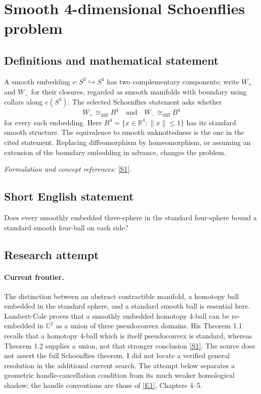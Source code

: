 \documentclass[11pt,a4paper]{article}
\newcommand{\R}{\mathbb{R}}
\newcommand{\C}{\mathbb{C}}
\newcommand{\sref}[2]{\hyperlink{source:#1:#2}{[S#2]}}
\newcommand{\eref}[2]{\hyperlink{extra:#1:#2}{[E#2]}}
\newif\ifshowcatalogue
\newcommand{\cataloguescope}[1]{\ifshowcatalogue
 \paragraph{Exact scope in the supplied catalogue.}
 \begin{quote}\small #1\end{quote}\fi}
\numberwithin{equation}{section}
\begin{document}
\setcounter{section}{0}
\clearpage
\section*{\texorpdfstring{Smooth 4-dimensional Schoenflies problem}{Smooth 4-dimensional Schoenflies problem}}\label{statement}
\subsection{Definitions and mathematical statement}
A smooth embedding $e:S^3\hookrightarrow S^4$ has two complementary components; write $W_+$ and $W_-$ for their closures, regarded as smooth manifolds with boundary using collars along $e(S^3)$. The selected Schoenflies statement asks whether
\[
 W_+\cong_{\mathrm{diff}}B^4\quad\text{and}\quad W_-\cong_{\mathrm{diff}}B^4
\]
for every such embedding. Here $B^4=\{x\in\R^4:\|x\|\le1\}$ has its standard smooth structure. The equivalence to smooth unknottedness is the one in the cited statement. Replacing diffeomorphism by homeomorphism, or assuming an extension of the boundary embedding in advance, changes the problem.
\par\smallskip\textit{Formulation and concept references:} \sref{statement}{1}.
\cataloguescope{Determine whether every smooth embedding of S\textasciicircum{}3 in S\textasciicircum{}4 is smoothly unknotted; equivalently, whether each of its two complementary closures is diffeomorphic to the standard 4-ball B\textasciicircum{}4.}
\subsection{Short English statement}
Does every smoothly embedded three-sphere in the standard four-sphere bound a standard smooth four-ball on each side?
\subsection{Research attempt}

\paragraph{Current frontier.}
The distinction between an abstract contractible manifold, a homotopy
ball embedded in the standard sphere, and a standard smooth ball is
essential here. Lambert-Cole proves that a smoothly embedded homotopy
4-ball can be re-embedded in $\C^2$ as a union of three pseudoconvex
domains. His Theorem 1.1 recalls that a homotopy 4-ball which is itself
pseudoconvex is standard, whereas Theorem 1.2 supplies a union, not that
stronger conclusion \sref{statement}{1}. The source does not assert the full
Schoenflies theorem. I did not locate a verified general resolution in
the additional current search. The attempt below separates a geometric
handle-cancellation condition from its much weaker homological shadow;
the handle conventions are those of \eref{statement}{1}, Chapters 4--5.
\end{document}
